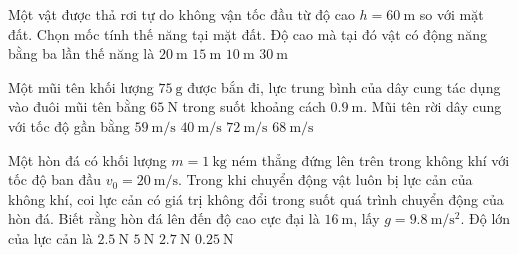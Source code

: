 \begin{ex}
	Một vật được thả rơi tự do không vận tốc đầu từ độ cao $h=\SI{60}{\meter}$ so với mặt đất. Chọn mốc tính thế năng tại mặt đất. Độ cao mà tại đó vật có động năng bằng ba lần thế năng là
	\choice
	{$\SI{20}{\meter}$}
	{\True $\SI{15}{\meter}$}
	{$\SI{10}{\meter}$}
	{$\SI{30}{\meter}$}
\end{ex}
\begin{ex}
	Một mũi tên khối lượng $\SI{75}{\gram}$ được bắn đi, lực trung bình của dây cung tác dụng vào đuôi mũi tên bằng $\SI{65}{\newton}$ trong suốt khoảng cách $\SI{0.9}{\meter}$. Mũi tên rời dây cung với tốc độ gần bằng
	\choice
	{$\SI{59}{\meter/\second}$}
	{\True $\SI{40}{\meter/\second}$}
	{$\SI{72}{\meter/\second}$}
	{$\SI{68}{\meter/\second}$}
\end{ex}
\begin{ex}
	Một hòn đá có khối lượng $m =\SI{1}{\kilogram}$ ném thẳng đứng lên trên trong không khí với tốc độ ban đầu $v_0=\SI{20}{\meter/\second}$. Trong khi chuyển động vật luôn bị lực cản của không khí, coi lực cản có giá trị không đổi trong suốt quá trình chuyển động của hòn đá. Biết rằng hòn đá lên đến độ cao cực đại là $\SI{16}{\meter}$, lấy $g=\SI{9.8}{\meter/\second^2}$. Độ lớn của lực cản là
	\choice
	{$\SI{2.5}{\newton}$}
	{$\SI{5}{\newton}$}
	{\True $\SI{2.7}{\newton}$}
	{$\SI{0.25}{\newton}$}
\end{ex}
